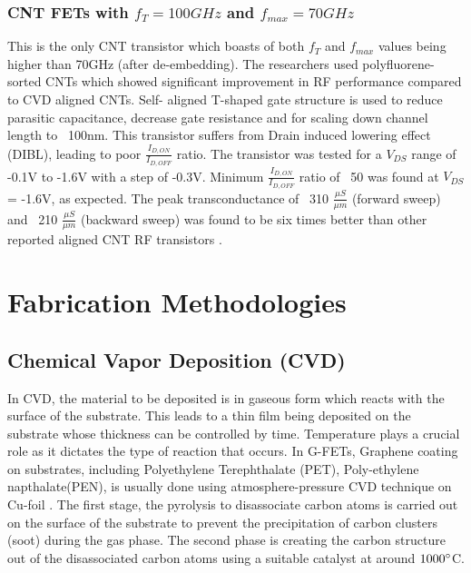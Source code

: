\documentclass[a4paper,11pt]{article}
\begin{document}
\subsubsection{CNT FETs with $f_T =100 GHz$   and $f_{max} = 70 GHz$ \cite{cao2016radio} }
This is the only CNT transistor which boasts of both $f_T$  and $f_{max}$ values being higher than 70GHz (after de-embedding). The researchers used polyfluorene-sorted CNTs which showed significant improvement in RF performance compared to CVD aligned CNTs. Self- aligned T-shaped gate structure is used to reduce parasitic capacitance, decrease gate resistance and for scaling down channel length to ~100nm. This transistor suffers from Drain induced lowering effect (DIBL), leading to poor $\frac{I_{D,ON}}{I_{D,OFF}}$ ratio. The transistor was tested for a $V_{DS}$ range of -0.1V to -1.6V with a step of -0.3V. Minimum $\frac{I_{D,ON}}{I_{D,OFF}}$ ratio of ~50 was found at $V_{DS}$ = -1.6V, as expected. The peak transconductance of ~310 $\frac{\mu S}{\mu m}$ (forward sweep) and ~210 $\frac{\mu S}{\mu m}$ (backward sweep) was found to be six times better than other reported aligned CNT RF transistors \cite{steiner2012high,che2013t}.

\section{Fabrication Methodologies}

\subsection{Chemical Vapor Deposition (CVD)}
In CVD, the material to be deposited is in gaseous form which reacts with the surface of the substrate. This leads to a thin film being deposited on the substrate whose thickness can be controlled by time. Temperature plays a crucial role as it dictates the type of reaction that occurs\cite{de2016cvd}. 
\newline
In G-FETs, Graphene coating on substrates, including Polyethylene Terephthalate (PET), Poly-ethylene napthalate(PEN), is usually done using atmosphere-pressure CVD technique on Cu-foil \cite{yeh2014gigahertz}. The first stage, the pyrolysis to disassociate carbon atoms is carried out on the surface of the substrate to prevent the precipitation of carbon clusters (soot) during the gas phase. The second phase is creating the carbon structure out of the disassociated carbon atoms using a suitable catalyst at around $1000 \degree$C.
   
\end{document}
